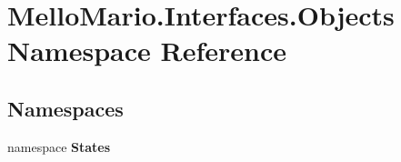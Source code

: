 \section{Mello\+Mario.\+Interfaces.\+Objects Namespace Reference}
\label{namespaceMelloMario_1_1Interfaces_1_1Objects}
\subsection*{Namespaces}
\begin{DoxyCompactItemize}
\item 
namespace \textbf{ States}
\end{DoxyCompactItemize}
